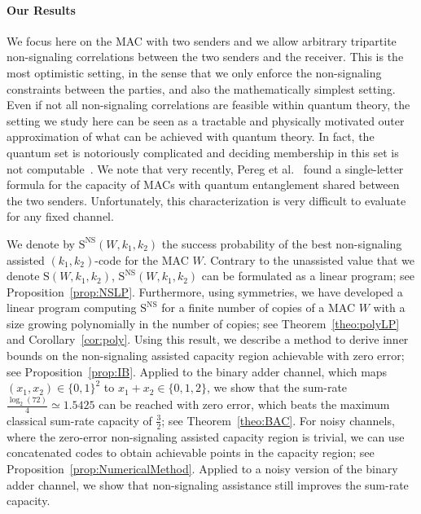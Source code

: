 \paragraph{Our Results} We focus here on the MAC with two senders and we allow arbitrary tripartite non-signaling correlations between the two senders and the receiver. This is the most optimistic setting, in the sense that we only enforce the non-signaling constraints between the parties, and also the mathematically simplest setting. Even if not all non-signaling correlations are feasible within quantum theory, the setting we study here can be seen as a tractable and physically motivated outer approximation of what can be achieved with quantum theory. In fact, the quantum set is notoriously complicated and deciding membership in this set is not computable~\cite{JNWY20}. We note that very recently, Pereg et al.~\cite{PDB23} found a single-letter formula for the capacity of MACs with quantum entanglement shared between the two senders. Unfortunately, this characterization is very difficult to evaluate for any fixed channel.

We denote by $\mathrm{S}^{\mathrm{NS}}(W,k_1,k_2)$ the success probability of the best non-signaling assisted $(k_1,k_2)$-code for the MAC $W$. Contrary to the unassisted value that we denote $\mathrm{S}(W,k_1,k_2)$,  $\mathrm{S}^{\mathrm{NS}}(W,k_1,k_2)$ can be formulated as a linear program; see Proposition~\ref{prop:NSLP}. Furthermore, using symmetries, we have developed a linear program computing $\mathrm{S}^{\mathrm{NS}}$ for a finite number of copies of a MAC $W$ with a size growing polynomially in the number of copies; see Theorem~\ref{theo:polyLP} and Corollary~\ref{cor:poly}. Using this result, we describe a method to derive inner bounds on the non-signaling assisted capacity region achievable with zero error; see Proposition~\ref{prop:IB}. Applied to the binary adder channel, which maps $(x_1, x_2) \in \{0,1\}^2$ to $x_1 + x_2 \in \{0,1,2\}$, we show that the sum-rate $\frac{\log_2(72)}{4} \simeq 1.5425$ can be reached with zero error, which beats the maximum classical sum-rate capacity of $\frac{3}{2}$; see Theorem~\ref{theo:BAC}. For noisy channels, where the zero-error non-signaling assisted capacity region is trivial, we can use concatenated codes to obtain achievable points in the capacity region; see Proposition~\ref{prop:NumericalMethod}. Applied to a noisy version of the binary adder channel, we show that non-signaling assistance still improves the sum-rate capacity. 

